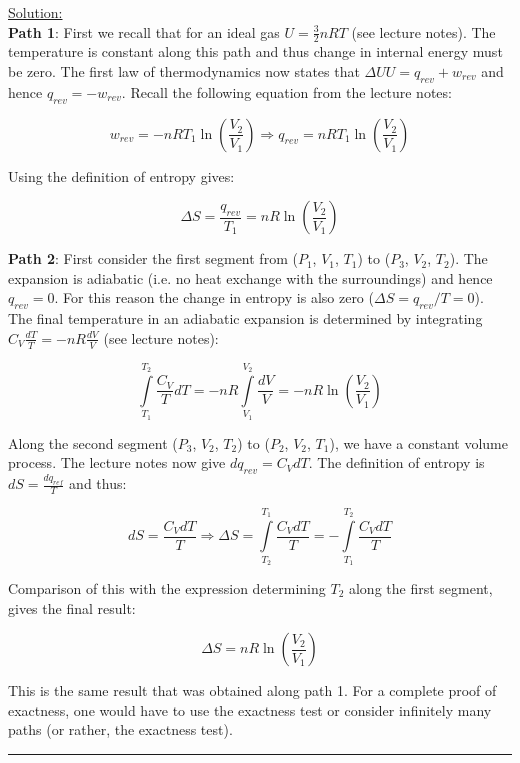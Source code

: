 \noindent
\underline{Solution:}\\

\textbf{Path 1}: First we recall that for an ideal gas $U = \frac{3}{2} nRT$ (see lecture notes). The temperature is constant along this path and thus change in internal energy must be zero. The first law of thermodynamics now states that $\Delta UU = q_{rev} + w_{rev}$ and hence $q_{rev} = -w_{rev}$. Recall the following equation from the lecture notes:

$$w_{rev} = -nRT_1\ln\left(\frac{V_2}{V_1}\right) \Rightarrow q_{rev} = nRT_1\ln\left(\frac{V_2}{V_1}\right)$$

Using the definition of entropy gives:

$$\Delta S = \frac{q_{rev}}{T_1} = nR\ln\left(\frac{V_2}{V_1}\right)$$

\textbf{Path 2}: First consider the first segment from ($P_1$, $V_1$, $T_1$) to ($P_3$, $V_2$, $T_2$). The expansion is adiabatic (i.e. no heat exchange with the surroundings) and hence $q_{rev} = 0$. For this reason the change in entropy is also zero ($\Delta S = q_{rev} / T = 0$). The final temperature in an adiabatic expansion is determined by integrating $C_V\frac{dT}{T} = -nR\frac{dV}{V}$ (see lecture notes):

$$\int\limits_{T_1}^{T_2}\frac{C_V}{T}dT = -nR\int\limits_{V_1}^{V_2}\frac{dV}{V} = -nR\ln\left(\frac{V_2}{V_1}\right)$$

Along the second segment ($P_3$, $V_2$, $T_2$) to ($P_2$, $V_2$, $T_1$), we have a constant volume process. The lecture notes now give $dq_{rev} = C_VdT$. The definition of entropy is $dS = \frac{dq_{ref}}{T}$ and thus:

$$dS = \frac{C_VdT}{T} \Rightarrow \Delta S = \int\limits_{T_2}^{T_1}\frac{C_VdT}{T} = -\int\limits_{T_1}^{T_2}\frac{C_VdT}{T}$$

Comparison of this with the expression determining $T_2$ along the first segment, gives the final result:

$$\Delta S = nR\ln\left(\frac{V_2}{V_1}\right)$$

This is the same result that was obtained along path 1. For a complete proof of exactness, one would have to use the exactness test or consider infinitely many paths (or rather, the exactness test).

\hrule\vspace{0.5cm}
